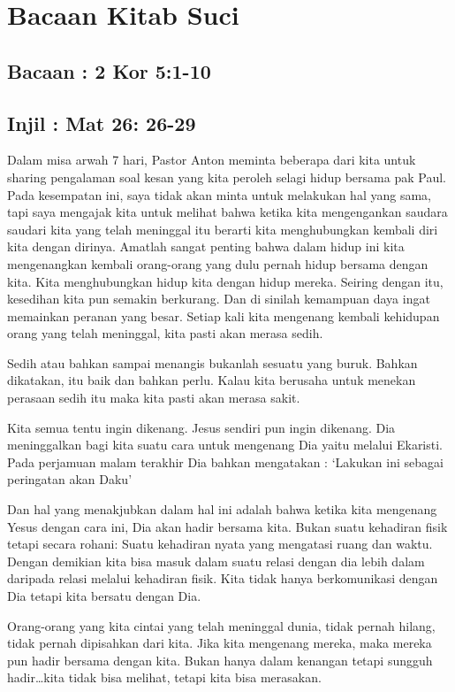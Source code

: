 \documentclass[12pt, twoside, a4paper,startany]{scrbook}
\begin{document}
\chapter*{Bacaan Kitab Suci}

\section*{Bacaan : 2 Kor 5:1-10}
\section*{Injil : Mat 26: 26-29}

Dalam misa arwah 7 hari, Pastor Anton meminta beberapa dari kita untuk sharing pengalaman soal kesan yang kita peroleh selagi hidup bersama pak Paul. Pada kesempatan ini, saya tidak akan minta untuk melakukan hal yang sama, tapi saya mengajak kita untuk melihat bahwa ketika kita mengengankan saudara saudari kita yang telah meninggal itu berarti kita menghubungkan kembali diri kita dengan dirinya. Amatlah sangat penting bahwa dalam hidup ini kita mengenangkan kembali orang-orang yang dulu pernah hidup bersama dengan kita. Kita menghubungkan hidup kita dengan hidup mereka. Seiring dengan itu, kesedihan kita pun semakin berkurang. Dan di sinilah kemampuan daya ingat memainkan peranan yang besar. Setiap kali kita mengenang kembali kehidupan orang yang telah meninggal, kita pasti akan merasa sedih. 

Sedih atau bahkan sampai menangis bukanlah sesuatu yang buruk. Bahkan dikatakan, itu baik dan bahkan perlu. Kalau kita berusaha untuk menekan perasaan sedih itu maka kita pasti akan merasa sakit. 

Kita semua tentu ingin dikenang. Jesus sendiri pun ingin dikenang. Dia meninggalkan bagi kita suatu cara untuk mengenang Dia yaitu melalui Ekaristi. Pada perjamuan malam terakhir Dia bahkan mengatakan : ‘Lakukan ini sebagai peringatan akan Daku’ 

Dan hal yang menakjubkan dalam hal ini adalah bahwa ketika kita mengenang Yesus dengan cara ini, Dia akan hadir bersama kita. Bukan suatu kehadiran fisik tetapi secara rohani: Suatu kehadiran nyata yang mengatasi ruang dan waktu. Dengan demikian kita bisa masuk dalam suatu relasi dengan dia lebih dalam daripada relasi melalui kehadiran fisik. Kita tidak hanya berkomunikasi dengan Dia tetapi kita bersatu dengan Dia. 

Orang-orang yang kita cintai yang telah meninggal dunia, tidak pernah hilang, tidak pernah dipisahkan dari kita. Jika kita mengenang mereka, maka mereka pun hadir bersama dengan kita. Bukan hanya dalam kenangan tetapi sungguh hadir…kita tidak bisa melihat, tetapi kita bisa merasakan.
\end{document}
